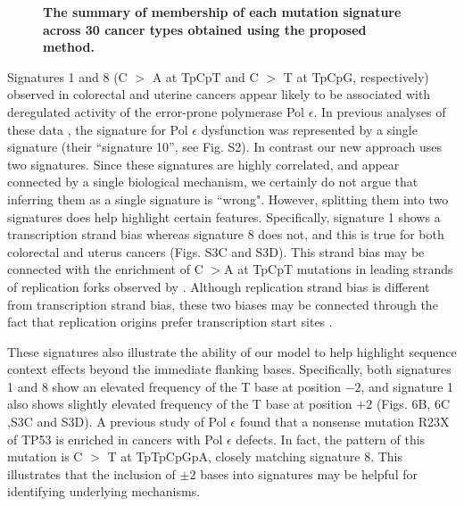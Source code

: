 \documentclass[10pt,letterpaper]{article}
\begin{document}
\begin{figure}[h]
\centering
\caption{{\bf The summary of membership of each mutation signature across 30 cancer types obtained using the proposed method.}}
\label{nature2013_sig_member}
\end{figure}



Signatures 1 and 8 (C $>$ A at TpCpT and C $>$ T at TpCpG, respectively) observed in colorectal and uterine cancers
appear likely to be associated with deregulated activity of the error-prone polymerase Pol $\epsilon$. 
In previous analyses of these data \cite{pmid23945592}, 
the signature for Pol $\epsilon$ dysfunction was represented by a single signature (their ``signature 10'', see Fig. S2).
In contrast our new approach uses two signatures.
Since these signatures are highly correlated,
and appear connected by
a single biological mechanism, we certainly do not argue
that inferring them as a single signature is ``wrong". However, splitting them into two signatures does help highlight certain features. Specifically,
signature 1 shows a transcription strand bias whereas signature 8 does not, and this is true for both colorectal and uterus cancers (Figs. S3C and S3D).
This strand bias may be connected with the enrichment of 
C $>$A at TpCpT mutations in leading strands of replication forks
observed by \cite{pmid25228659}. Although replication strand bias is different from transcription strand bias, these two biases may be connected through the fact that replication origins prefer transcription start sites \cite{pmid23187890}.

These signatures also illustrate the ability of our model
to help highlight sequence context effects beyond the immediate flanking bases. Specifically, both signatures 1 and 8  show an elevated frequency of the T base at position $-2$,
and signature 1 also shows slightly elevated frequency of the T base at position $+2$
 (Figs. 6B, 6C ,S3C and S3D).
A previous study of Pol $\epsilon$  \cite{pmid25228659} 
found that a nonsense mutation R23X of TP53 is enriched in cancers with Pol $\epsilon$ defects.
In fact, the pattern of this mutation is C $>$ T at TpTpCpGpA, closely matching signature 8.
This illustrates that the inclusion of $\pm 2$ bases 
into signatures may be helpful for identifying underlying mechanisms.
\end{document}
